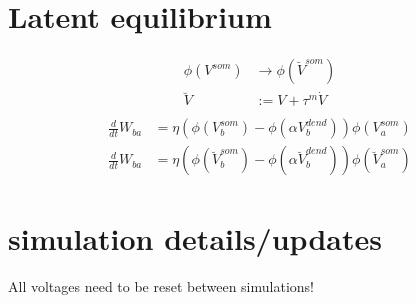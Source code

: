 \section{Latent equilibrium}

\begin{align}
  \phi(V^{som}) & \rightarrow \phi(\breve{V}^{som}) \\
  \breve{V}     & := V + \tau^m \dot{V}             \\
\end{align}
\begin{align}
  \frac{d}{dt} W_{ba} & = \eta (\phi(V_b^{som}) - \phi(\alpha V_b^{dend})) \phi(V_a^{som})                         \\
  \frac{d}{dt} W_{ba} & = \eta (\phi(\breve{V}_b^{som}) - \phi(\alpha \breve{V}_b^{dend})) \phi(\breve{V}_a^{som})
\end{align}


\section{simulation details/updates}

All voltages need to be reset between simulations!

